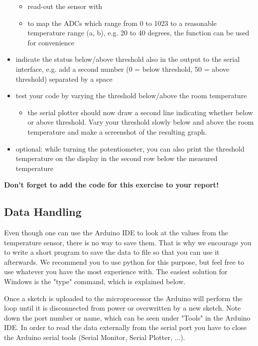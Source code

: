 \begin{itemize}
\begin{itemize}
        \item read-out the sensor with 
        \item to map the ADCs which range from 0 to 1023 to a reasonable temperature range (a, b), e.g. 20 to 40 degrees, the function  can be used for convenience
 	\end{itemize} 
 	\item indicate the status below/above threshold also in the output to the serial interface, e.g. add a second number (0 = below threshold, 50 = above threshold) separated by a space
    	\item test your code by varying the threshold below/above the room temperature
	\begin{itemize}
		\item the serial plotter should now draw a second line indicating whether below or above threshold. Vary your threshold slowly below and above the room temperature and make a screenshot of the resulting graph.
 	\end{itemize}
    	\item optional: while turning the potentiometer, you can also print the threshold temperature on the display in the second row below the measured temperature
\end{itemize}

\textbf{Don't forget to add the code for this exercise to your report!}

\subsection{Data Handling}\label{sec:data}
Even though one can use the Arduino \ac{IDE} to look at the values from the temperature sensor, there is no way to save them. That is why we encourage you to write a short program to save the data to file so that you can use it afterwards. We recommend you to use python for this purpose, but feel free to use whatever you have the most experience with. The easiest solution for Windows is the "type" command, which is explained below. \par
Once a sketch is uploaded to the microprocessor the Arduino will perform the loop until it is disconnected from power or overwritten by a new sketch. Note down the port number or name, which can be seen under "Tools" in the Arduino IDE. In order to read the data externally from the serial port you have to close the Arduino serial tools (Serial Monitor, Serial Plotter, ...).\\


